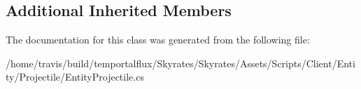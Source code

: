\subsection*{Additional Inherited Members}


The documentation for this class was generated from the following file\-:\begin{DoxyCompactItemize}
\item 
/home/travis/build/temportalflux/\-Skyrates/\-Skyrates/\-Assets/\-Scripts/\-Client/\-Entity/\-Projectile/Entity\-Projectile.\-cs\end{DoxyCompactItemize}
